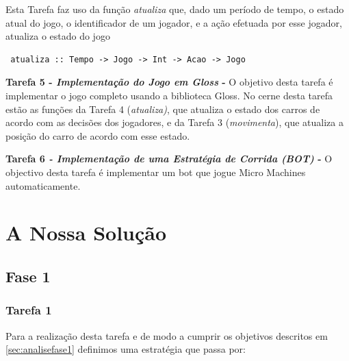 \documentclass[a4paper]{report} %
\begin{document}
Esta Tarefa faz uso da função \emph{atualiza} que, dado um período de tempo, o estado atual do jogo, o identificador de um jogador, e a ação efetuada por esse jogador, atualiza o estado do jogo
 

\begin{verbatim}
 atualiza :: Tempo -> Jogo -> Int -> Acao -> Jogo 
\end{verbatim}



\textbf{ Tarefa 5 - \emph{Implementação do Jogo em Gloss} -} O objetivo desta tarefa é implementar o jogo completo usando a biblioteca Gloss. No cerne desta tarefa estão as funções da Tarefa 4 (\emph{atualiza)}, que atualiza o estado dos
carros de acordo com as decisões dos jogadores, e da Tarefa 3 (\emph{movimenta}), que atualiza a
posição do carro de acordo com esse estado.



\textbf{ Tarefa 6 \emph{- Implementação de uma Estratégia de Corrida (BOT)} -} O objectivo desta tarefa é implementar um bot que jogue Micro Machines automaticamente.


\chapter{A Nossa Solução}
\label{sec:solucao}

\section{Fase 1}
\label{sec:solucaofase1}

\subsection{Tarefa 1}
\label{subsec:solucaotarefa1}

Para a realização desta tarefa e de modo a cumprir os objetivos descritos em \ref{sec:analisefase1}
definimos uma estratégia que passa por:
\end{document}

